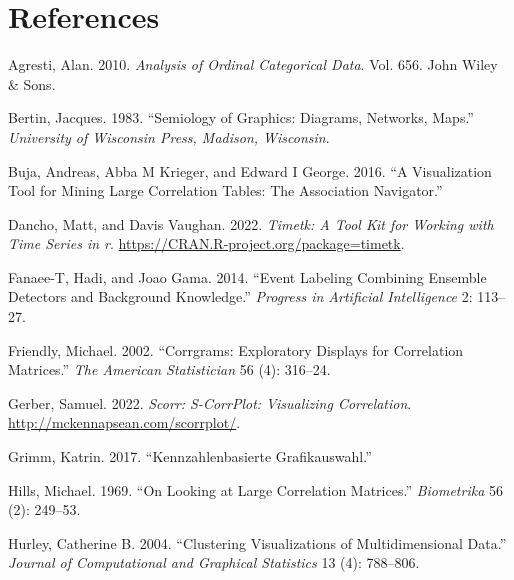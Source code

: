 \hypertarget{references}{%
\section*{References}\label{references}}

\hypertarget{refs}{}
\begin{CSLReferences}{1}{0}
\leavevmode{}%
Agresti, Alan. 2010. \emph{Analysis of Ordinal Categorical Data}. Vol. 656. John Wiley \& Sons.

\leavevmode{}%
Bertin, Jacques. 1983. {``Semiology of Graphics: Diagrams, Networks, Maps.''} \emph{University of Wisconsin Press, Madison, Wisconsin}.

\leavevmode{}%
Buja, Andreas, Abba M Krieger, and Edward I George. 2016. {``A Visualization Tool for Mining Large Correlation Tables: The Association Navigator.''}

\leavevmode{}%
Dancho, Matt, and Davis Vaughan. 2022. \emph{Timetk: A Tool Kit for Working with Time Series in r}. \url{https://CRAN.R-project.org/package=timetk}.

\leavevmode{}%
Fanaee-T, Hadi, and Joao Gama. 2014. {``Event Labeling Combining Ensemble Detectors and Background Knowledge.''} \emph{Progress in Artificial Intelligence} 2: 113--27.

\leavevmode{}%
Friendly, Michael. 2002. {``Corrgrams: Exploratory Displays for Correlation Matrices.''} \emph{The American Statistician} 56 (4): 316--24.

\leavevmode{}%
Gerber, Samuel. 2022. \emph{Scorr: S-CorrPlot: Visualizing Correlation}. \url{http://mckennapsean.com/scorrplot/}.

\leavevmode{}%
Grimm, Katrin. 2017. {``Kennzahlenbasierte Grafikauswahl.''}

\leavevmode{}%
Hills, Michael. 1969. {``On Looking at Large Correlation Matrices.''} \emph{Biometrika} 56 (2): 249--53.

\leavevmode{}%
Hurley, Catherine B. 2004. {``Clustering Visualizations of Multidimensional Data.''} \emph{Journal of Computational and Graphical Statistics} 13 (4): 788--806.


\end{CSLReferences}
